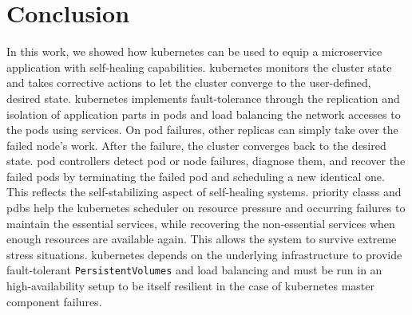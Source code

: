 
\section{Conclusion}\label{sec:conclusion}
  In this work, we showed how \gls{kubernetes} can be used to equip a microservice application with self-healing capabilities.
  \Gls{kubernetes} monitors the cluster state and takes corrective actions to let the cluster converge to the user-defined, desired state.
  \Gls{kubernetes} implements fault-tolerance through the replication and isolation of application parts in pods and load balancing the network accesses to the pods using \glspl{service}.
  On pod failures, other replicas can simply take over the failed node's work.
  After the failure, the cluster converges back to the desired state.
  \Glspl{pod controller} detect pod or node failures, diagnose them, and recover the failed pods by terminating the failed pod and scheduling a new identical one.
  This reflects the self-stabilizing aspect of self-healing systems.
  \Glspl{priority class} and \glspl{pdb} help the \gls{kubernetes} scheduler on resource pressure and occurring failures to maintain the essential services, while recovering the non-essential services when enough resources are available again.
  This allows the system to survive extreme stress situations.
  \Gls{kubernetes} depends on the underlying infrastructure to provide fault-tolerant \texttt{PersistentVolumes} and load balancing and must be run in an high-availability setup to be itself resilient in the case of \gls{kubernetes} master component failures.